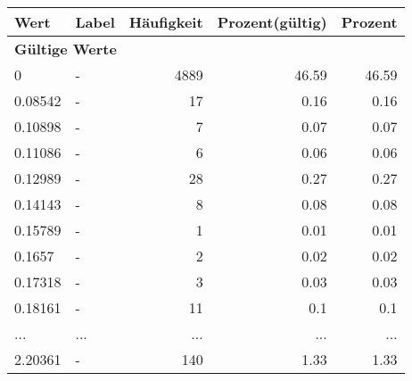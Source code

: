      \begin{longtable}{lXrrr}
     \toprule
     \textbf{Wert} & \textbf{Label} & \textbf{Häufigkeit} & \textbf{Prozent(gültig)} & \textbf{Prozent} \\
     \endhead
     \midrule
     \multicolumn{5}{l}{\textbf{Gültige Werte}}\\
        0 & \multicolumn{1}{X}{-} & %
          \num{4889} &
          \num[round-mode=places,round-precision=2]{46.59} &
          \num[round-mode=places,round-precision=2]{46.59} \\
        0.08542 & \multicolumn{1}{X}{-} & %
          \num{17} &
          \num[round-mode=places,round-precision=2]{0.16} &
          \num[round-mode=places,round-precision=2]{0.16} \\
        0.10898 & \multicolumn{1}{X}{-} & %
          \num{7} &
          \num[round-mode=places,round-precision=2]{0.07} &
          \num[round-mode=places,round-precision=2]{0.07} \\
        0.11086 & \multicolumn{1}{X}{-} & %
          \num{6} &
          \num[round-mode=places,round-precision=2]{0.06} &
          \num[round-mode=places,round-precision=2]{0.06} \\
        0.12989 & \multicolumn{1}{X}{-} & %
          \num{28} &
          \num[round-mode=places,round-precision=2]{0.27} &
          \num[round-mode=places,round-precision=2]{0.27} \\
        0.14143 & \multicolumn{1}{X}{-} & %
          \num{8} &
          \num[round-mode=places,round-precision=2]{0.08} &
          \num[round-mode=places,round-precision=2]{0.08} \\
        0.15789 & \multicolumn{1}{X}{-} & %
          \num{1} &
          \num[round-mode=places,round-precision=2]{0.01} &
          \num[round-mode=places,round-precision=2]{0.01} \\
        0.1657 & \multicolumn{1}{X}{-} & %
          \num{2} &
          \num[round-mode=places,round-precision=2]{0.02} &
          \num[round-mode=places,round-precision=2]{0.02} \\
        0.17318 & \multicolumn{1}{X}{-} & %
          \num{3} &
          \num[round-mode=places,round-precision=2]{0.03} &
          \num[round-mode=places,round-precision=2]{0.03} \\
        0.18161 & \multicolumn{1}{X}{-} & %
          \num{11} &
          \num[round-mode=places,round-precision=2]{0.1} &
          \num[round-mode=places,round-precision=2]{0.1} \\
       ... & ... & ... & ... & ... \\
        2.20361 & \multicolumn{1}{X}{-} & %
          \num{140} &
          \num[round-mode=places,round-precision=2]{1.33} &
          \num[round-mode=places,round-precision=2]{1.33} \\


\end{longtable}
